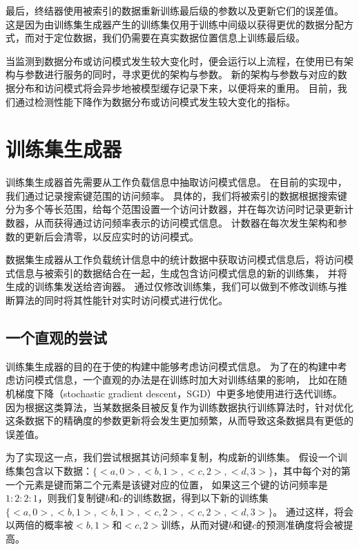 最后，终结器使用被索引的数据重新训练{\rmi}最后级{\model}的参数以及更新它们的误差值。
这是因为由训练集生成器产生的训练集仅用于训练中间级{\model}以获得更优的数据分配方式，而对于定位数据，我们仍需要在真实数据位置信息上训练最后级{\model}。

当{\sys}监测到数据分布或访问模式发生较大变化时，便会运行以上流程，在使用已有{\rmi}架构与参数进行服务的同时，寻求更优的{\rmi}架构与参数。
新的{\rmi}架构与参数与对应的数据分布和访问模式将会异步地被模型缓存记录下来，以便将来的重用。
目前，我们通过检测{\li}性能下降作为数据分布或访问模式发生较大变化的指标。

\section{训练集生成器}

训练集生成器首先需要从工作负载信息中抽取访问模式信息。
在目前的实现中，我们通过记录搜索键范围的访问频率。
具体的，我们将被索引的数据根据搜索键分为多个等长范围，给每个范围设置一个访问计数器，并在每次访问时记录更新计数器，从而获得通过访问频率表示的访问模式信息。
计数器在每次发生{\rmi}架构和参数的更新后会清零，以反应实时的访问模式。

数据集生成器从工作负载统计信息中的统计数据中获取访问模式信息后，将访问模式信息与被索引的数据结合在一起，生成包含访问模式信息的新的训练集，
并将生成的训练集发送给咨询器。
通过仅修改训练集，我们可以做到不修改{\rmi}训练与推断算法的同时将其性能针对实时访问模式进行优化。


\subsection{一个直观的尝试}
\label{sec:pattern-intuitive}

训练集生成器的目的在于使{\li}的构建中能够考虑访问模式信息。
为了在{\li}的构建中考虑访问模式信息，一个直观的办法是在训练时加大{\hotkey}对训练结果的影响，
比如在随机梯度下降（stochastic gradient descent，SGD）中更多地使用{\hotkey}进行迭代训练。
因为根据这类算法，当某数据条目被反复作为训练数据执行训练算法时，针对优化这条数据下的精确度的参数更新将会发生更加频繁，从而导致这条数据具有更低的误差值。

为了实现这一点，我们尝试根据其访问频率复制{\hotkey}，构成新的训练集。
假设一个训练集包含以下数据：$\{<a, 0>, <b, 1>, <c, 2>, <d, 3>\}$，其中每个对的第一个元素是键而第二个元素是该键对应的位置，
如果这三个键的访问频率是$1:2:2:1$，则我们复制键$b$和$c$的训练数据，得到以下新的训练集$\{<a, 0>, <b, 1>, <b, 1>, <c, 2>, <c, 2>, <d, 3>\}$。
通过这样，{\model}将会以两倍的概率被$<b, 1>$和$<c, 2>$训练，从而对键$b$和键$c$的预测准确度将会被提高。


